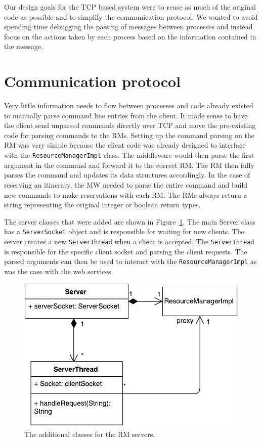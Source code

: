 \documentclass{article}
\begin{document}
Our design goals for the TCP based system were to reuse as much of the original code as possible and to simplify the communication protocol. 
We wanted to avoid spending time debugging the passing of messages between processes and instead focus on the actions taken by each process based on the information contained in the message. 

\section{Communication protocol}
Very little information needs to flow between processes and code already existed to manually parse command line entries from the client. 
It made sense to have the client send unparsed commands directly over TCP and move the pre-existing code for parsing commands to the RMs. 
Setting up the command parsing on the RM was very simple because the client code was already designed to interface with the \texttt{ResourceManagerImpl} class.  
The middleware would then parse the first argument in the command and forward it to the correct RM. 
The RM then fully parses the command and updates its data structures accordingly. 
In the case of reserving an itinerary, the MW needed to parse the entire command and build new commands to make reservations with each RM. 
The RMs always return a string representing the original integer or boolean return types. 

The server classes that were added are shown in Figure~\ref{f:server-class}. The main Server class has a \texttt{ServerSocket} object and is responsible for waiting for new clients. The server creates a new \texttt{ServerThread} when a client is accepted. The \texttt{ServerThread} is responsible for the specific client socket and parsing the client requests. The parsed arguments can then be used to interact with the \texttt{ResourceManagerImpl} as was the case with the web services.



\begin{figure}[h]
\centering
\includegraphics[scale=0.6]{figures/server-class.pdf}
\caption{The additional classes for the RM servers.}
\label{f:server-class}
\end{figure}
\end{document}
